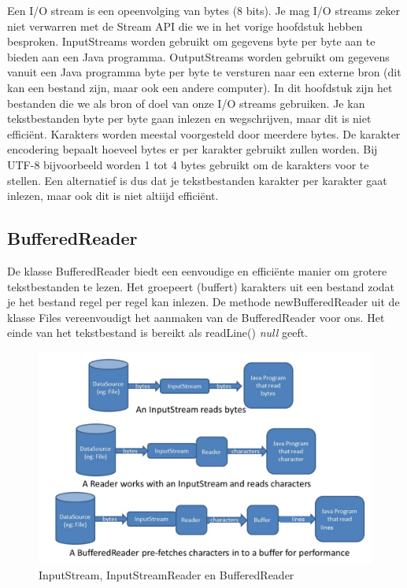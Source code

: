 Een I/O stream is een opeenvolging van bytes (8 bits). Je mag I/O streams zeker niet verwarren met de Stream API die we in het vorige hoofdstuk hebben besproken. InputStreams worden gebruikt om gegevens byte per byte aan te bieden aan een Java programma. OutputStreams worden gebruikt om gegevens vanuit een Java programma byte per byte te versturen naar een externe bron (dit kan een bestand zijn, maar ook een andere computer). 
In dit hoofdstuk zijn het bestanden die we als bron of doel van onze I/O streams gebruiken. Je kan tekstbestanden byte per byte gaan inlezen en wegschrijven, maar dit is niet effici\"ent. Karakters worden meestal voorgesteld door meerdere bytes. 
De karakter encodering bepaalt hoeveel bytes er per karakter gebruikt zullen worden. Bij UTF-8 bijvoorbeeld worden 1 tot 4 bytes gebruikt om de karakters voor te stellen. Een alternatief is dus dat je tekstbestanden karakter per karakter gaat inlezen, maar ook dit is niet altiijd effici\"ent.

\subsection{BufferedReader}

De klasse BufferedReader biedt een eenvoudige en effici\"ente manier om grotere tekstbestanden te lezen. Het groepeert (buffert) karakters uit een bestand zodat je het bestand regel per regel kan inlezen. De methode newBufferedReader uit de klasse Files vereenvoudigt het aanmaken van de BufferedReader voor ons.
Het einde van het tekstbestand is bereikt als readLine() \textit{null} geeft.

\begin{figure}[H]
  \includegraphics[width=\linewidth]{images/h8/stream_reader.png}
  \caption{InputStream, InputStreamReader en BufferedReader}
  \label{fig:paths}
\end{figure}

